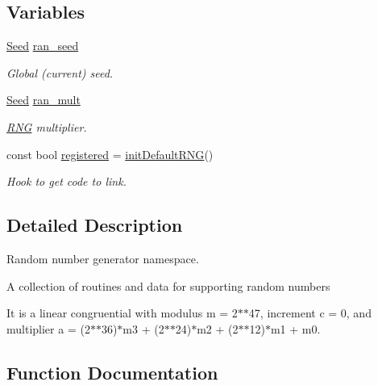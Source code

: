 \subsection*{Variables}
\begin{DoxyCompactItemize}
\item 
\mbox{\hyperlink{group__defs_ga8a5a983ab64ca8f6a5419885bacd4c40}{Seed}} \mbox{\hyperlink{namespaceENSEM_1_1RNG_a3d617978a554c127dc164947d602b288}{ran\+\_\+seed}}
\begin{DoxyCompactList}\small\item\em Global (current) seed. \end{DoxyCompactList}\item 
\mbox{\hyperlink{group__defs_ga8a5a983ab64ca8f6a5419885bacd4c40}{Seed}} \mbox{\hyperlink{namespaceENSEM_1_1RNG_a934549765fb4b894a8dafd77fb0aa3d1}{ran\+\_\+mult}}
\begin{DoxyCompactList}\small\item\em \mbox{\hyperlink{namespaceENSEM_1_1RNG}{R\+NG}} multiplier. \end{DoxyCompactList}\item 
const bool \mbox{\hyperlink{namespaceENSEM_1_1RNG_ac792bd2933a030bd73c2ffd2d289cc53}{registered}} = \mbox{\hyperlink{namespaceENSEM_1_1RNG_a4a7ec2d430ab092440b9c3b2b5fd9e64}{init\+Default\+R\+NG}}()
\begin{DoxyCompactList}\small\item\em Hook to get code to link. \end{DoxyCompactList}\end{DoxyCompactItemize}


\subsection{Detailed Description}
Random number generator namespace. 

A collection of routines and data for supporting random numbers

It is a linear congruential with modulus m = 2$\ast$$\ast$47, increment c = 0, and multiplier a = (2$\ast$$\ast$36)$\ast$m3 + (2$\ast$$\ast$24)$\ast$m2 + (2$\ast$$\ast$12)$\ast$m1 + m0. 

\subsection{Function Documentation}
\mbox{\label{namespaceENSEM_1_1RNG_a4a7ec2d430ab092440b9c3b2b5fd9e64}} 
